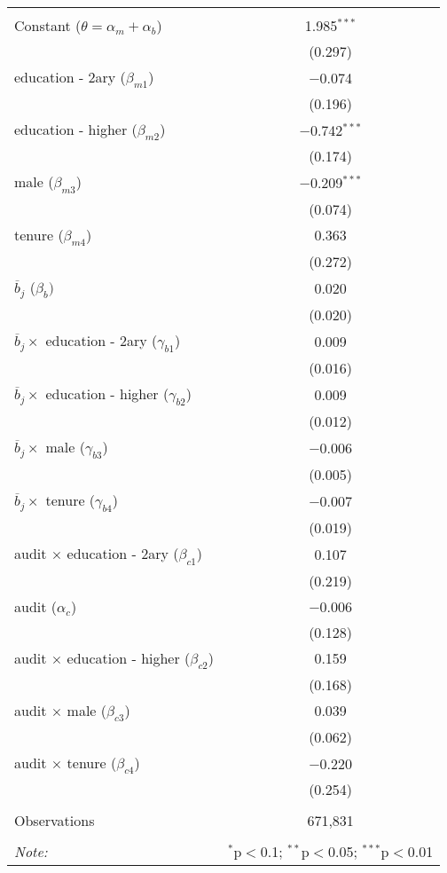 
\begingroup 
\footnotesize 
\begin{tabular}{@{\extracolsep{5pt}}lc} 
\\[-1.8ex]\hline 
\hline \\[-1.8ex] 
 Constant ($\theta = \alpha_m + \alpha_b$) & 1.985$^{***}$ \\ 
  & (0.297) \\ 
  education - 2ary ($\beta_{m1}$) & $-$0.074 \\ 
  & (0.196) \\ 
  education - higher ($\beta_{m2}$) & $-$0.742$^{***}$ \\ 
  & (0.174) \\ 
  male ($\beta_{m3}$) & $-$0.209$^{***}$ \\ 
  & (0.074) \\ 
  tenure ($\beta_{m4}$) & 0.363 \\ 
  & (0.272) \\ 
  $\overline{b}_j$ ($\beta_b)$ & 0.020 \\ 
  & (0.020) \\ 
  $\overline{b}_j \times$ education - 2ary ($\gamma_{b1}$) & 0.009 \\ 
  & (0.016) \\ 
  $\overline{b}_j \times$ education - higher ($\gamma_{b2}$) & 0.009 \\ 
  & (0.012) \\ 
  $\overline{b}_j \times$ male ($\gamma_{b3}$) & $-$0.006 \\ 
  & (0.005) \\ 
  $\overline{b}_j \times$ tenure ($\gamma_{b4}$) & $-$0.007 \\ 
  & (0.019) \\ 
  audit $\times$ education - 2ary ($\beta_{c1}$) & 0.107 \\ 
  & (0.219) \\ 
  audit ($\alpha_c$) & $-$0.006 \\ 
  & (0.128) \\ 
  audit $\times$ education - higher ($\beta_{c2}$) & 0.159 \\ 
  & (0.168) \\ 
  audit $\times$ male ($\beta_{c3}$) & 0.039 \\ 
  & (0.062) \\ 
  audit $\times$ tenure ($\beta_{c4}$) & $-$0.220 \\ 
  & (0.254) \\ 
 \hline \\[-1.8ex] 
Observations & 671,831 \\ 
\hline 
\hline \\[-1.8ex] 
\textit{Note:}  & \multicolumn{1}{r}{$^{*}$p$<$0.1; $^{**}$p$<$0.05; $^{***}$p$<$0.01} \\ 
\end{tabular} 
\endgroup 
